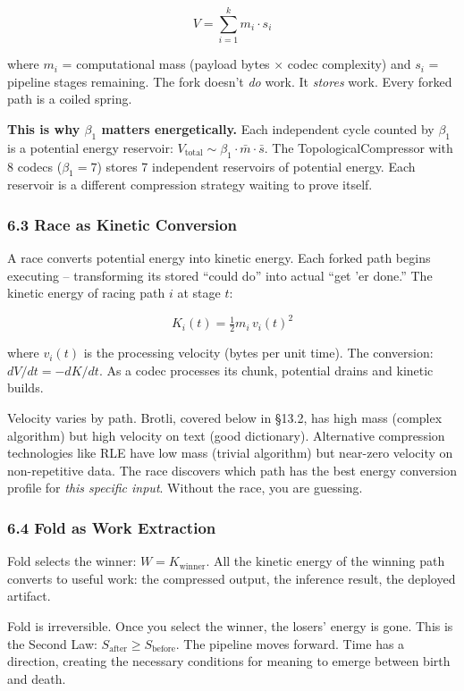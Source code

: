 \documentclass[
  11pt,
]{article}
\begin{document}
\[
V = \sum_{i=1}^{k} m_i \cdot s_i
\]

where \(m_i\) = computational mass (payload bytes \(\times\) codec
complexity) and \(s_i\) = pipeline stages remaining. The fork doesn't
\emph{do} work. It \emph{stores} work. Every forked path is a coiled
spring.

\textbf{This is why \(\beta_1\) matters energetically.} Each independent
cycle counted by \(\beta_1\) is a potential energy reservoir:
\(V_{\text{total}} \sim \beta_1 \cdot \bar{m} \cdot \bar{s}\). The
TopologicalCompressor with 8 codecs (\(\beta_1 = 7\)) stores 7
independent reservoirs of potential energy. Each reservoir is a
different compression strategy waiting to prove itself.

\subsubsection{6.3 Race as Kinetic
Conversion}\label{race-as-kinetic-conversion}

A race converts potential energy into kinetic energy. Each forked path
begins executing -- transforming its stored ``could do'' into actual
``get 'er done.'' The kinetic energy of racing path \(i\) at stage
\(t\):

\[
K_i(t) = \tfrac{1}{2} m_i \, v_i(t)^2
\]

where \(v_i(t)\) is the processing velocity (bytes per unit time). The
conversion: \(dV/dt = -dK/dt\). As a codec processes its chunk,
potential drains and kinetic builds.

Velocity varies by path. Brotli, covered below in §13.2, has high mass
(complex algorithm) but high velocity on text (good dictionary).
Alternative compression technologies like RLE have low mass (trivial
algorithm) but near-zero velocity on non-repetitive data. The race
discovers which path has the best energy conversion profile for
\emph{this specific input}. Without the race, you are guessing.

\subsubsection{6.4 Fold as Work
Extraction}\label{fold-as-work-extraction}

Fold selects the winner: \(W = K_{\text{winner}}\). All the kinetic
energy of the winning path converts to useful work: the compressed
output, the inference result, the deployed artifact.

Fold is irreversible. Once you select the winner, the losers' energy is
gone. This is the Second Law:
\(S_{\text{after}} \geq S_{\text{before}}\). The pipeline moves forward.
Time has a direction, creating the necessary conditions for meaning to
emerge between birth and death.
\end{document}
